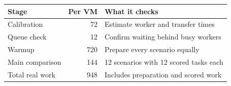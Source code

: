 \begin{table}[H]
\centering
\label{table:stages:start}
\begin{tabular}{lrl}
\toprule
\textbf{Stage} & \textbf{Per VM} & \textbf{What it checks} \\
\midrule
Calibration & 72 & Estimate worker and transfer times \\
Queue check & 12 & Confirm waiting behind busy workers \\
Warmup & 720 & Prepare every scenario equally \\
Main comparison & 144 & 12 scenarios with 12 scored tasks each \\
Total real work & 948 & Includes preparation and scored work \\
\bottomrule
\end{tabular}
\label{table:stages:end}
\end{table}
